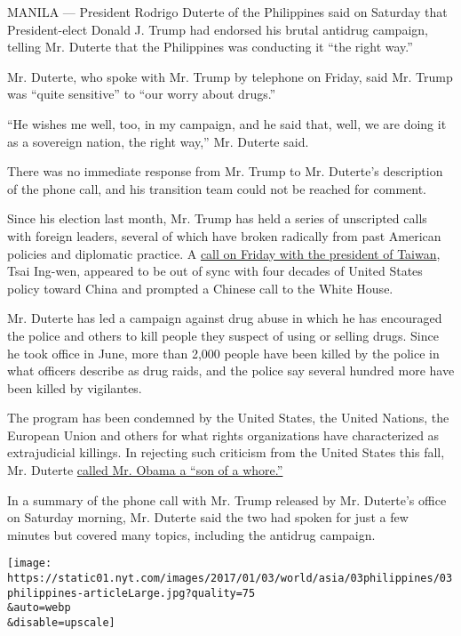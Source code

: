 MANILA --- President Rodrigo Duterte of the Philippines said on Saturday
that President-elect Donald J. Trump had endorsed his brutal antidrug
campaign, telling Mr. Duterte that the Philippines was conducting it
``the right way.''

Mr. Duterte, who spoke with Mr. Trump by telephone on Friday, said Mr.
Trump was ``quite sensitive'' to ``our worry about drugs.''

``He wishes me well, too, in my campaign, and he said that, well, we are
doing it as a sovereign nation, the right way,'' Mr. Duterte said.

There was no immediate response from Mr. Trump to Mr. Duterte's
description of the phone call, and his transition team could not be
reached for comment.

Since his election last month, Mr. Trump has held a series of unscripted
calls with foreign leaders, several of which have broken radically from
past American policies and diplomatic practice. A
\href{http://www.nytimes.com/2016/12/02/us/politics/trump-speaks-with-taiwans-leader-a-possible-affront-to-china.html}{call
on Friday with the president of Taiwan}, Tsai Ing-wen, appeared to be
out of sync with four decades of United States policy toward China and
prompted a Chinese call to the White House.

Mr. Duterte has led a campaign against drug abuse in which he has
encouraged the police and others to kill people they suspect of using or
selling drugs. Since he took office in June, more than 2,000 people have
been killed by the police in what officers describe as drug raids, and
the police say several hundred more have been killed by vigilantes.

The program has been condemned by the United States, the United Nations,
the European Union and others for what rights organizations have
characterized as extrajudicial killings. In rejecting such criticism
from the United States this fall, Mr. Duterte
\href{http://www.nytimes.com/interactive/2016/09/30/world/asia/rodrigo-duterte-quotes-hitler-whore-philippines.html}{called
Mr. Obama a ``son of a whore.''}

In a summary of the phone call with Mr. Trump released by Mr. Duterte's
office on Saturday morning, Mr. Duterte said the two had spoken for just
a few minutes but covered many topics, including the antidrug campaign.

\texttt{[image: https://static01.nyt.com/images/2017/01/03/world/asia/03philippines/03philippines-articleLarge.jpg?quality=75\\\&auto=webp\\\&disable=upscale]}

